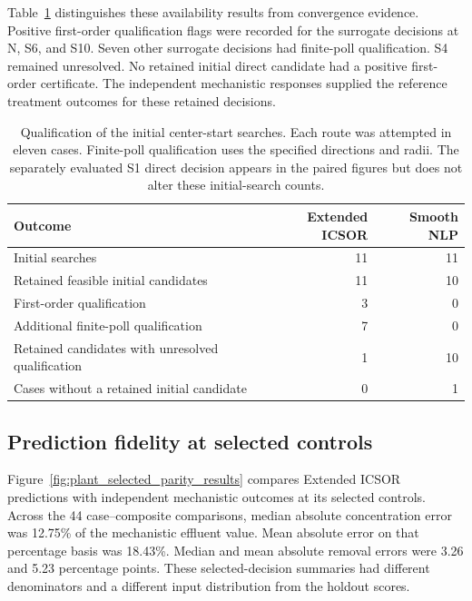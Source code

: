 Table~\ref{tab:plant_search_qualification_results} distinguishes these availability results from convergence evidence. Positive first-order qualification flags were recorded for the surrogate decisions at N, S6, and S10. Seven other surrogate decisions had finite-poll qualification. S4 remained unresolved. No retained initial direct candidate had a positive first-order certificate. The independent mechanistic responses supplied the reference treatment outcomes for these retained decisions.

\begin{table}[htbp]
\centering\small
\caption{Qualification of the initial center-start searches. Each route was attempted in eleven cases. Finite-poll qualification uses the specified directions and radii. The separately evaluated S1 direct decision appears in the paired figures but does not alter these initial-search counts.}
\label{tab:plant_search_qualification_results}
\begin{tabular}{p{7.0cm}rr}
\toprule
Outcome & Extended ICSOR & Smooth NLP\\
\midrule
Initial searches & 11 & 11\\
Retained feasible initial candidates & 11 & 10\\
First-order qualification & 3 & 0\\
Additional finite-poll qualification & 7 & 0\\
Retained candidates with unresolved qualification & 1 & 10\\
Cases without a retained initial candidate & 0 & 1\\
\bottomrule
\end{tabular}
\end{table}

\subsection{Prediction fidelity at selected controls}

Figure~\ref{fig:plant_selected_parity_results} compares Extended ICSOR predictions with independent mechanistic outcomes at its selected controls. Across the 44 case--composite comparisons, median absolute concentration error was 12.75\% of the mechanistic effluent value. Mean absolute error on that percentage basis was 18.43\%. Median and mean absolute removal errors were 3.26 and 5.23 percentage points. These selected-decision summaries had different denominators and a different input distribution from the holdout scores.

